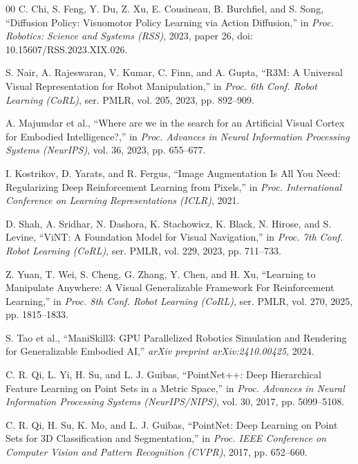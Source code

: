 \documentclass[conference]{IEEEtran}
\begin{document}
\begin{thebibliography}{00}
 C. Chi, S. Feng, Y. Du, Z. Xu, E. Cousineau, B. Burchfiel, and S. Song, ``Diffusion Policy: Visuomotor Policy Learning via Action Diffusion,'' in \textit{Proc. Robotics: Science and Systems (RSS)}, 2023, paper 26, doi: 10.15607/RSS.2023.XIX.026.

 S. Nair, A. Rajeswaran, V. Kumar, C. Finn, and A. Gupta, ``R3M: A Universal Visual Representation for Robot Manipulation,'' in \textit{Proc. 6th Conf. Robot Learning (CoRL)}, ser. PMLR, vol. 205, 2023, pp. 892--909.

 A. Majumdar et al., ``Where are we in the search for an Artificial Visual Cortex for Embodied Intelligence?,'' in \textit{Proc. Advances in Neural Information Processing Systems (NeurIPS)}, vol. 36, 2023, pp. 655--677.

 I. Kostrikov, D. Yarats, and R. Fergus, ``Image Augmentation Is All You Need: Regularizing Deep Reinforcement Learning from Pixels,'' in \textit{Proc. International Conference on Learning Representations (ICLR)}, 2021.

 D. Shah, A. Sridhar, N. Dashora, K. Stachowicz, K. Black, N. Hirose, and S. Levine, ``ViNT: A Foundation Model for Visual Navigation,'' in \textit{Proc. 7th Conf. Robot Learning (CoRL)}, ser. PMLR, vol. 229, 2023, pp. 711--733.

 Z. Yuan, T. Wei, S. Cheng, G. Zhang, Y. Chen, and H. Xu, ``Learning to Manipulate Anywhere: A Visual Generalizable Framework For Reinforcement Learning,'' in \textit{Proc. 8th Conf. Robot Learning (CoRL)}, ser. PMLR, vol. 270, 2025, pp. 1815--1833.

 S. Tao et al., ``ManiSkill3: GPU Parallelized Robotics Simulation and Rendering for Generalizable Embodied AI,'' \textit{arXiv preprint arXiv:2410.00425}, 2024.

 C. R. Qi, L. Yi, H. Su, and L. J. Guibas, ``PointNet++: Deep Hierarchical Feature Learning on Point Sets in a Metric Space,'' in \textit{Proc. Advances in Neural Information Processing Systems (NeurIPS/NIPS)}, vol. 30, 2017, pp. 5099--5108.

 C. R. Qi, H. Su, K. Mo, and L. J. Guibas, ``PointNet: Deep Learning on Point Sets for 3D Classification and Segmentation,'' in \textit{Proc. IEEE Conference on Computer Vision and Pattern Recognition (CVPR)}, 2017, pp. 652--660.
\end{thebibliography}
\end{document}
